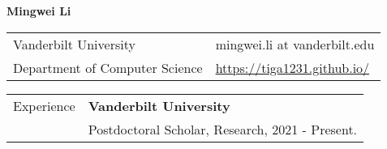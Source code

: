 \documentclass[letterpaper,11pt,oneside]{article}
\begin{document}

\noindent  \LARGE{\textbf{Mingwei Li}}  \\
\vspace{-2ex}
\normalsize


\begin{center}
\begin{tabular}{l l}
 Vanderbilt University & \hspace{1in} mingwei.li at vanderbilt.edu \\
 Department of Computer Science & \hspace{1in}  \href{https://tiga1231.github.io/}{https://tiga1231.github.io/}   \\
\end{tabular}
\end{center}

\vspace{1em}


\noindent \begin{tabular}{@{} l l}
\Large{Experience}    & \textbf{Vanderbilt University} \\
    & Postdoctoral Scholar, Research, 2021 - Present. \\
\end{tabular}
\end{document}
